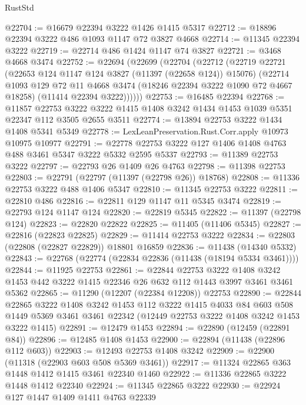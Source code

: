\begin{lexlean}{RustStd}
\begin{coremodule}
@22704 := @16679 @22394 @3222 @1426 @1415 @5317
@22712 := @18896 @22394 @3222 @486 @1093 @1147 @72 @3827 @4668
@22714 := @11345 @22394 @3222
@22719 := @22714 @486 @1424 @1147 @74 @3827
@22721 := @3468 @4668 @3474
@22752 := @22694
    (@22699
      (@22704
        (@22712
          (@22719
            @22721
            (@22653 @124 @1147 @124 @3827 (@11397 (@22658 @124)) @15076)
            (@22714
              @1093
              @129
              @72
              @11
              @4668
              @3474
              (@18246 @22394 @3222 @1090 @72 @4667 @18258)
              (@11414 @22394 @3222))))))
@22753 := @16485 @22394
@22768 := @11857
    @22753
    @3222
    @3222
    @1415
    @1408
    @3242
    @1434
    @1453
    @1039
    @5351
    @22347
    @112
    @3505
    @2655
    @3511
@22774 := @13894 @22753 @3222 @1434 @1408 @5341 @5349
@22778 := LexLeanPreservation.Rust.Corr.apply @10973 @10975 @10977
@22791 := @22778 @22753 @3222 @127 @1406 @1408 @4763 @488 @3461 @5347 @3222 @5332 @2595 @5337
@22793 := @11389 @22753 @3222
@22797 := @22793 @26 @1409 @26 @4763
@22798 := @11398 @22753
@22803 := @22791 (@22797 (@11397 (@22798 @26)) @18768)
@22808 := @11336 @22753 @3222 @488 @1406 @5347
@22810 := @11345 @22753 @3222
@22811 := @22810 @486
@22816 := @22811 @129 @1147 @11 @5345 @3474
@22819 := @22793 @124 @1147 @124
@22820 := @22819 @5345
@22822 := @11397 (@22798 @124)
@22823 := @22820 @22822
@22825 := @11405 (@11406 @5345)
@22827 := @22816 (@22823 @22825)
@22829 := @11414 @22753 @3222
@22834 := @22803 (@22808 (@22827 @22829)) @18801 @16859
@22836 := @11438 (@14340 @5332)
@22843 := @22768 (@22774 (@22834 @22836 (@11438 (@18194 @5334 @3461))))
@22844 := @11925 @22753
@22861 := @22844
    @22753
    @3222
    @1408
    @3242
    @1453
    @442
    @3222
    @1415
    @22346
    @26
    @632
    @112
    @1443
    @3997
    @3461
    @3461
    @5362
@22865 := @11290 (@12207 (@22384 @12208)) @22753
@22890 := @22844
    @22865
    @3222
    @1408
    @3242
    @1453
    @112
    @3222
    @1415
    @4033
    @84
    @603
    @508
    @1449
    @5369
    @3461
    @3461
    @22342
    (@12449 @22753 @3222 @1408 @3242 @1453 @3222 @1415)
@22891 := @12479 @1453
@22894 := @22890 (@12459 (@22891 @84))
@22896 := @12485 @1408 @1453
@22900 := @22894 (@11438 (@22896 @112 @603))
@22903 := @12493 @22753 @1408 @3242
@22909 := @22900 (@11318 (@22903 @603 @508 @5369 @3461))
@22917 := @11324 @22865 @363 @1448 @1412 @1415 @3461 @22340 @1460
@22922 := @11336 @22865 @3222 @1448 @1412 @22340
@22924 := @11345 @22865 @3222
@22930 := @22924 @127 @1447 @1409 @1411 @4763 @22339

\end{coremodule}
\end{lexlean}
